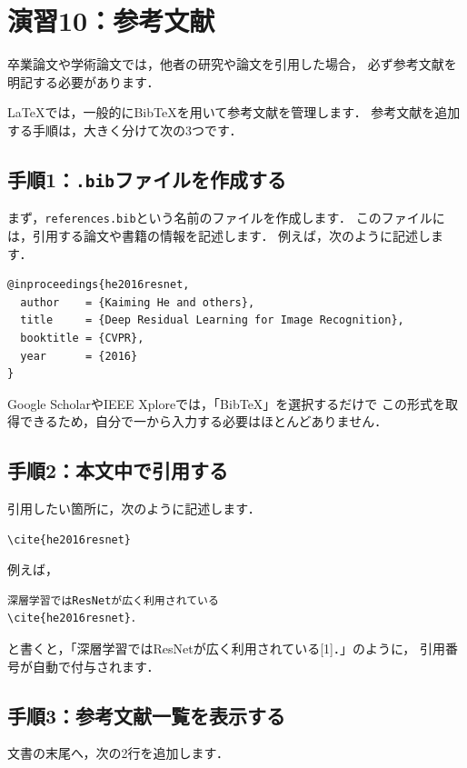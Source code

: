 \documentclass[a4paper,twocolumn]{jsarticle}
\begin{document}
\section*{演習10：参考文献}
卒業論文や学術論文では，他者の研究や論文を引用した場合，
必ず参考文献を明記する必要があります．

LaTeXでは，一般的にBibTeXを用いて参考文献を管理します．
参考文献を追加する手順は，大きく分けて次の3つです．

\subsection*{手順1：\texttt{.bib}ファイルを作成する}
まず，\texttt{references.bib}という名前のファイルを作成します．
このファイルには，引用する論文や書籍の情報を記述します．
例えば，次のように記述します．

\begin{lstlisting}[language={}]
@inproceedings{he2016resnet,
  author    = {Kaiming He and others},
  title     = {Deep Residual Learning for Image Recognition},
  booktitle = {CVPR},
  year      = {2016}
}
\end{lstlisting}

Google ScholarやIEEE Xploreでは，「BibTeX」を選択するだけで
この形式を取得できるため，自分で一から入力する必要はほとんどありません．

\subsection*{手順2：本文中で引用する}
引用したい箇所に，次のように記述します．

\begin{verbatim}
\cite{he2016resnet}
\end{verbatim}

例えば，

\begin{verbatim}
深層学習ではResNetが広く利用されている
\cite{he2016resnet}．
\end{verbatim}

と書くと，「深層学習ではResNetが広く利用されている[1]．」のように，
引用番号が自動で付与されます．

\subsection*{手順3：参考文献一覧を表示する}
文書の末尾へ，次の2行を追加します．

\begin{verbatim}


\end{verbatim}
\end{document}
